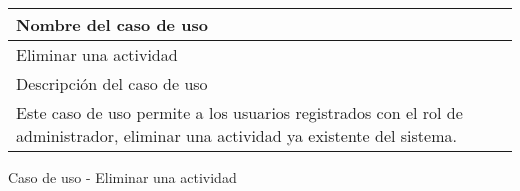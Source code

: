 \begin{identificacionCasoDeUso}
	\begin{tabular} { | p{17cm} |}

		\hline
		Nombre del caso de uso                                                                                                            \\ \hline
		Eliminar una actividad                                                                                                            \\ \hline
		Descripción del caso de uso                                                                                                       \\ \hline
		Este caso de uso permite a los usuarios registrados con el rol de administrador, eliminar una actividad ya existente del sistema. \\ \hline
	\end{tabular}
	\caption{Caso de uso - Eliminar una actividad}
\end{identificacionCasoDeUso}
